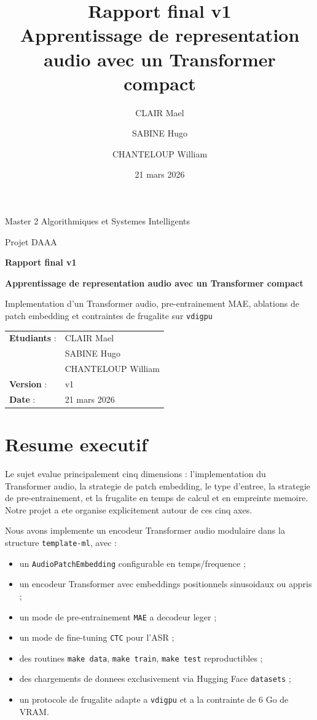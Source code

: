 \documentclass[11pt,a4paper]{article}
\title{Rapport final v1\\Apprentissage de representation audio avec un Transformer compact}
\author{CLAIR Mael \and SABINE Hugo \and CHANTELOUP William}
\date{21 mars 2026}
\begin{document}
\begin{titlepage}
\centering
{\Large Master 2 Algorithmiques et Systemes Intelligents\par}
\vspace{0.3cm}
{\large Projet DAAA\par}
\vspace{1.2cm}
{\LARGE\bfseries Rapport final v1\par}
\vspace{0.35cm}
{\Large\bfseries Apprentissage de representation audio avec un Transformer compact\par}
\vspace{0.8cm}
{\large
Implementation d'un Transformer audio, pre-entrainement MAE, ablations de patch embedding et contraintes de frugalite sur \texttt{vdigpu}\par}
\vfill
\begin{tabular}{ll}
\textbf{Etudiants} : & CLAIR Mael \\
 & SABINE Hugo \\
 & CHANTELOUP William \\
\textbf{Version} : & v1 \\
\textbf{Date} : & 21 mars 2026 \\
\end{tabular}
\vfill
\end{titlepage}

\tableofcontents
\newpage

\section{Resume executif}
Le sujet evalue principalement cinq dimensions : l'implementation du Transformer audio, la strategie de patch embedding, le type d'entree, la strategie de pre-entrainement, et la frugalite en temps de calcul et en empreinte memoire. Notre projet a ete organise explicitement autour de ces cinq axes.

Nous avons implemente un encodeur Transformer audio modulaire dans la structure \texttt{template-ml}, avec :
\begin{itemize}[leftmargin=1.2cm]
\item un \texttt{AudioPatchEmbedding} configurable en temps/frequence ;
\item un encodeur Transformer avec embeddings positionnels sinusoidaux ou appris ;
\item un mode de pre-entrainement \texttt{MAE} a decodeur leger ;
\item un mode de fine-tuning \texttt{CTC} pour l'ASR ;
\item des routines \texttt{make data}, \texttt{make train}, \texttt{make test} reproductibles ;
\item des chargements de donnees exclusivement via Hugging Face \texttt{datasets} ;
\item un protocole de frugalite adapte a \texttt{vdigpu} et a la contrainte de 6 Go de VRAM.
\end{itemize}
\end{document}
